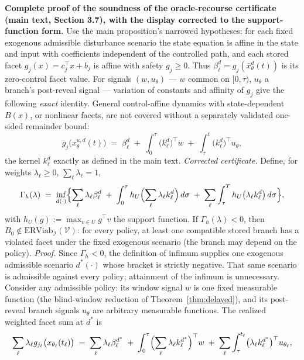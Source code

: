 \documentclass[11pt]{article}
\theoremstyle{definition}
\begin{document}
\bigskip
\noindent\textbf{Complete proof of the soundness of the oracle-recourse
certificate (main text, Section 3.7), with the display corrected to the
support-function form.}
Use the main proposition's narrowed hypotheses: for each fixed exogenous
admissible disturbance scenario the state equation is affine in the state
and input with coefficients independent of the controlled path, and each
stored facet \(g_j(x)=c_j^\top x+b_j\) is affine with safety
\(g_j\ge0\). Thus \(\beta_\ell^d=g_j(\bar x_\theta^d(t))\) is its
zero-control facet value. For signals \((w,u_\theta)\) --- \(w\) common
on \([0,\tau)\), \(u_\theta\) a branch's post-reveal signal ---
variation of constants and affinity of \(g_j\) give the following
\emph{exact} identity. General control-affine dynamics with
state-dependent \(B(x)\), or nonlinear facets, are not covered without
a separately validated one-sided remainder bound:
\[
g_{j}\bigl(x_{\theta}^{u, d}(t)\bigr) \;=\; \beta_{\ell}^{d}
\;+\; \int_{0}^{\tau} \bigl(k_{\ell}^{d}\bigr)^{\top} w
\;+\; \int_{\tau}^{t} \bigl(k_{\ell}^{d}\bigr)^{\top} u_{\theta},
\]
the kernel \(k_{\ell}^{d}\) exactly as defined in the main text.
\emph{Corrected certificate.} Define, for weights
\(\lambda_{\ell} \ge 0\), \(\sum_{\ell} \lambda_{\ell} = 1\),
\[
\Gamma_{h}(\lambda) \;=\; \inf_{d(\cdot)} \Bigl\{ \sum_{\ell}
\lambda_{\ell} \beta_{\ell}^{d} \;+\; \int_{0}^{\tau}
h_{U}\Bigl(\sum_{\ell} \lambda_{\ell} k_{\ell}^{d}\Bigr)\, d\sigma
\;+\; \sum_{\ell} \int_{\tau}^{T} h_{U}\bigl(\lambda_{\ell}
k_{\ell}^{d}\bigr)\, d\sigma \Bigr\},
\]
with \(h_{U}(g) := \max_{v \in U} g^{\top} v\) the support function. If
\(\Gamma_{h}(\lambda) < 0\), then \(B_{0} \notin
\mathrm{ERViab}_{\mathcal{I}}(\mathcal{V})\): for every policy,
at least one compatible stored branch has a violated facet under the
fixed exogenous scenario (the branch may depend on the policy).
\emph{Proof.} Since \(\Gamma_h<0\), the definition of infimum supplies
one exogenous admissible scenario \(d^{*}(\cdot)\) whose bracket is
strictly negative. That same scenario is admissible against every
policy; attainment of the infimum is unnecessary. Consider any
admissible policy: its window signal \(w\) is one fixed measurable
function (the blind-window reduction of
Theorem~\ref{thm:delayed}), and its post-reveal branch signals
\(u_{\theta}\) are arbitrary measurable functions. The realized
weighted facet sum at \(d^{*}\) is
\[
\sum_{\ell} \lambda_{\ell} g_{j_{\ell}}\bigl(x_{\theta_{\ell}}(t_{\ell})
\bigr) \;=\; \sum_{\ell} \lambda_{\ell} \beta_{\ell}^{d^{*}}
\;+\; \int_{0}^{\tau} \Bigl(\sum_{\ell} \lambda_{\ell}
k_{\ell}^{d^{*}}\Bigr)^{\top} w \;+\; \sum_{\ell} \int_{\tau}^{t_{\ell}}
\bigl(\lambda_{\ell} k_{\ell}^{d^{*}}\bigr)^{\top} u_{\theta_{\ell}},
\]
\end{document}
